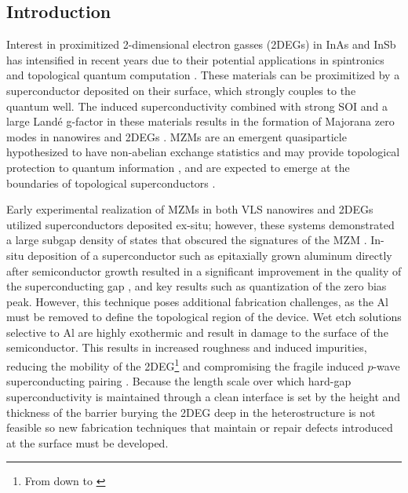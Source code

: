 \subsection{\label{sec:surf_intro}Introduction}

Interest in proximitized 2-dimensional electron gasses (2DEGs) in InAs and InSb has intensified in recent years due to their potential applications in spintronics \cite{spintronics} and topological quantum computation \cite{PhysRevLett.105.077001,s41578-018-0003-1}. These materials can be proximitized by a superconductor deposited on their surface, which strongly couples to the quantum well. The induced superconductivity combined with strong SOI and a large Land\'e g-factor in these materials results in the formation of Majorana zero modes in  nanowires \cite{Mourik1003,AlbretchNature} and 2DEGs \cite{PhysRevLett.119.136803,PhysRevLett.119.176805}. MZMs are an emergent quasiparticle hypothesized to have non-abelian exchange statistics and may provide topological protection to quantum information \cite{RevModPhys.80.1083}, and are expected to emerge at the boundaries of topological superconductors \cite{RevModPhys.83.1057,Kitaev_2001,doi:10.1146/030212-184337}.

Early experimental realization of MZMs in both VLS nanowires and 2DEGs utilized superconductors deposited ex-situ; however, these systems demonstrated a large subgap density of states that obscured the signatures of the MZM \cite{PhysRevB.88.064506,PhysRevLett.110.186803}. In-situ deposition of a superconductor such as epitaxially grown aluminum directly after semiconductor growth resulted in a significant improvement in the quality of the superconducting gap \cite{nnano.2014.306,hard_gap_2deg}, and key results such as quantization of the zero bias peak. However, this technique poses additional fabrication challenges, as the Al must be removed to define the topological region of the device. Wet etch solutions selective to Al are highly exothermic and result in damage to the surface of the semiconductor. This results in increased roughness and induced impurities, reducing the mobility of the 2DEG\footnote{From  \cite{shabani_transport} down to  \cite{hard_gap_2deg,PhysRevLett.115.127001}} and compromising the fragile induced $p$-wave superconducting pairing \cite{PhysRevB.83.184520,PhysRevB.85.140513}. Because the length scale over which hard-gap superconductivity is maintained through a clean interface is set by the height and thickness of the barrier \cite{PhysRevLett.110.186803} burying the 2DEG deep in the heterostructure is not feasible \cite{PhysRevB.93.155402} so new fabrication techniques that maintain or repair defects introduced at the surface must be developed.

